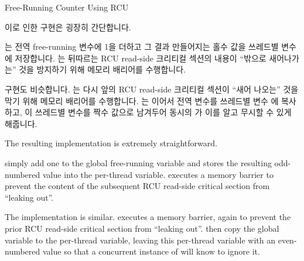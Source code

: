 \begin{listing}[tbp]
\vspace*{-11pt}
\caption{Free-Running Counter Using RCU}
\label{lst:app:toyrcu:Free-Running Counter Using RCU}
\end{listing}

이로 인한  구현은 굉장히 간단합니다.
\begin{fcvref}
 는 전역 free-running  변수에 1을 더하고 그 결과
만들어지는 홀수 값을 쓰레드별 변수  에 저장합니다.
 는 뒤따르는 RCU read-side 크리티컬 섹션의 내용이 ``밖으로
새어나가는'' 것을 방지하기 위해 메모리 배리어를 수행합니다.
\end{fcvref}

\begin{fcvref}
 구현도 비슷합니다.
 는 다시 앞의 RCU read-side 크리티컬 섹션이 ``새어 나오는'' 것을
막기 위해 메모리 배리어를 수행합니다.
 는 이어서  전역 변수를 쓰레드별 변수
 에 복사하고, 이 쓰레드별 변수를 짝수 값으로 남겨두어 동시의
 가 이를 알고 무시할 수 있게 해줍니다.
\end{fcvref}

\iffalse

The resulting  implementation is extremely
straightforward.
\begin{fcvref}
 simply
add one to the global free-running 
variable and stores the resulting odd-numbered value into the
 per-thread variable.
 executes a memory barrier to prevent the content of the
subsequent RCU read-side critical section from ``leaking out''.
\end{fcvref}

\begin{fcvref}
The  implementation is similar.
 executes a memory barrier, again to prevent the prior RCU
read-side critical section from ``leaking out''.
 then copy the  global variable to the
 per-thread variable, leaving this per-thread
variable with an even-numbered value so that a concurrent instance
of  will know to ignore it.
\end{fcvref}

